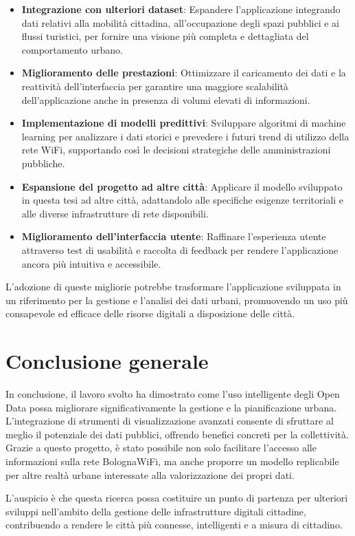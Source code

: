 \begin{itemize}
    \item \textbf{Integrazione con ulteriori dataset}: Espandere l'applicazione integrando dati relativi alla mobilità cittadina, all'occupazione degli spazi pubblici e ai flussi turistici, per fornire una visione più completa e dettagliata del comportamento urbano.
    \item \textbf{Miglioramento delle prestazioni}: Ottimizzare il caricamento dei dati e la reattività dell'interfaccia per garantire una maggiore scalabilità dell'applicazione anche in presenza di volumi elevati di informazioni.
    \item \textbf{Implementazione di modelli predittivi}: Sviluppare algoritmi di machine learning per analizzare i dati storici e prevedere i futuri trend di utilizzo della rete WiFi, supportando così le decisioni strategiche delle amministrazioni pubbliche.
    \item \textbf{Espansione del progetto ad altre città}: Applicare il modello sviluppato in questa tesi ad altre città, adattandolo alle specifiche esigenze territoriali e alle diverse infrastrutture di rete disponibili.
    \item \textbf{Miglioramento dell'interfaccia utente}: Raffinare l'esperienza utente attraverso test di usabilità e raccolta di feedback per rendere l'applicazione ancora più intuitiva e accessibile.
\end{itemize}

L'adozione di queste migliorie potrebbe trasformare l'applicazione sviluppata in un riferimento per la gestione e l'analisi dei dati urbani, promuovendo un uso più consapevole ed efficace delle risorse digitali a disposizione delle città.

\section*{Conclusione generale}

In conclusione, il lavoro svolto ha dimostrato come l'uso intelligente degli Open Data possa migliorare significativamente la gestione e la pianificazione urbana. L'integrazione di strumenti di visualizzazione avanzati consente di sfruttare al meglio il potenziale dei dati pubblici, offrendo benefici concreti per la collettività. Grazie a questo progetto, è stato possibile non solo facilitare l'accesso alle informazioni sulla rete BolognaWiFi, ma anche proporre un modello replicabile per altre realtà urbane interessate alla valorizzazione dei propri dati.

L'auspicio è che questa ricerca possa costituire un punto di partenza per ulteriori sviluppi nell'ambito della gestione delle infrastrutture digitali cittadine, contribuendo a rendere le città più connesse, intelligenti e a misura di cittadino.
